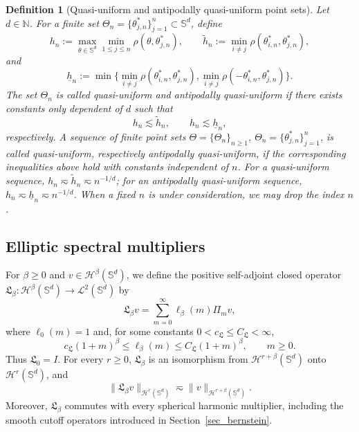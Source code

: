 \documentclass{article}
\numberwithin{equation}{section}
\newtheorem{definition}{Definition}
\def\sul{\sum\limits}
\begin{document}
\begin{definition}[Quasi-uniform and antipodally quasi-uniform point sets]\label{def:quasiuniform_sequence}
Let $d\in\mathbb{N}$. For a finite set
$\Theta_n=\{\theta_{j,n}^*\}_{j=1}^n\subset\mathbb{S}^d$, define
\begin{equation*}
    h_n:=\max_{\theta\in\mathbb{S}^d}\min_{1\le j\le n}\rho(\theta,\theta_{j,n}^*),
    \qquad
    \tilde{h}_n:=\min_{i\ne j}\rho(\theta_{i,n}^*,\theta_{j,n}^*),
\end{equation*}
and
\begin{equation*}
    \underline{h}_n:=
    \min\Big\{
      \min_{i\ne j}\rho(\theta_{i,n}^*,\theta_{j,n}^*),
      \min_{i\ne j}\rho(-\theta_{i,n}^*,\theta_{j,n}^*)
    \Big\}.
\end{equation*}
The set $\Theta_n$ is called quasi-uniform and antipodally quasi-uniform if there exists constants only dependent of $d$ such that
\begin{equation}\label{eqn:quasi-uniform}
    h_n\lesssim\tilde{h}_n,\qquad h_n\lesssim\underline{h}_n,
\end{equation}
respectively. A sequence of finite point sets
$\Theta=\{\Theta_n\}_{n\ge1}$, $\Theta_n=\{\theta_{j,n}^*\}_{j=1}^n$, is called quasi-uniform, respectively antipodally quasi-uniform, if the corresponding inequalities above hold with constants independent of $n$.
For a quasi-uniform sequence, $h_n\eqsim\tilde{h}_n\eqsim n^{-1/d}$; for an antipodally quasi-uniform sequence, $h_n\eqsim\underline{h}_n\eqsim n^{-1/d}$.
When a fixed $n$ is under consideration, we may drop the index $n$.
\end{definition}

\medskip

\subsection{Elliptic spectral multipliers}

For $\beta\geq0$ and $v\in\mathcal H^\beta(\mathbb S^d)$, we define the positive self-adjoint closed operator $\mathfrak L_\beta:\mathcal H^\beta(\mathbb S^d)\to\mathcal L^2(\mathbb S^d)$ by
\begin{equation}\label{eqn:def_operator}
\mathfrak L_\beta v=\sul_{m=0}^\infty\ell_\beta(m)\Pi_m v,
\end{equation}
where $\ell_0(m)=1$ and, for some constants $0<c_{\mathfrak L}\leq C_{\mathfrak L}<\infty$,
\begin{equation}\label{eqn:elliptic_symbol}
c_{\mathfrak L}(1+m)^\beta\leq\ell_\beta(m)\leq C_{\mathfrak L}(1+m)^\beta,\qquad m\geq0.
\end{equation}
Thus $\mathfrak L_0=I$. For every $r\geq0$, $\mathfrak L_\beta$ is an isomorphism from $\mathcal H^{r+\beta}(\mathbb S^d)$ onto $\mathcal H^r(\mathbb S^d)$, and
\begin{equation}\label{eqn:operator_equivalence}
\|\mathfrak L_\beta v\|_{\mathcal H^r(\mathbb S^d)}\eqsim\|v\|_{\mathcal H^{r+\beta}(\mathbb S^d)}.
\end{equation}
Moreover, $\mathfrak L_\beta$ commutes with every spherical harmonic multiplier, including the smooth cutoff operators introduced in Section~\ref{sec_bernstein}.
\end{document}
